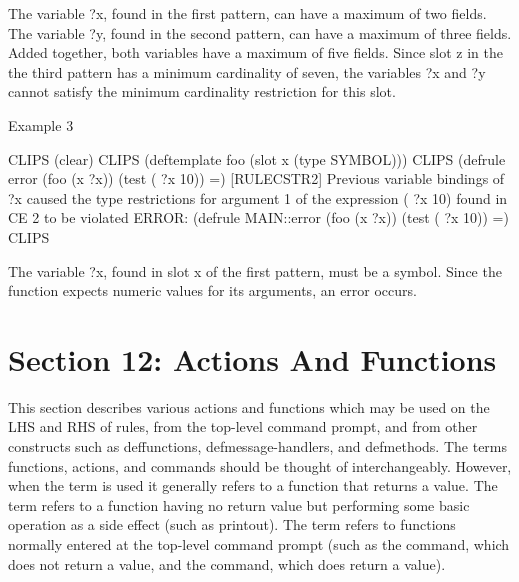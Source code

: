 \documentclass[letterpaper,10pt,english]{sphinxmanual}
\begin{document}
The variable ?x, found in the first pattern, can have a maximum of two
fields. The variable ?y, found in the second pattern, can have a maximum
of three fields. Added together, both variables have a maximum of five
fields. Since slot z in the the third pattern has a minimum cardinality
of seven, the variables ?x and ?y cannot satisfy the minimum cardinality
restriction for this slot.

Example 3

\begin{sphinxVerbatim}[commandchars=\\\{\}]
CLIPS\PYGZgt{} (clear)
CLIPS\PYGZgt{} (deftemplate foo (slot x (type SYMBOL)))
CLIPS\PYGZgt{}
(defrule error
(foo (x ?x))
(test (\PYGZgt{} ?x 10))
=\PYGZgt{})
[RULECSTR2] Previous variable bindings of ?x caused the type
restrictions for argument \PYGZsh{}1 of the expression (\PYGZgt{} ?x 10)
found in CE \PYGZsh{}2 to be violated
ERROR:
(defrule MAIN::error
(foo (x ?x))
(test (\PYGZgt{} ?x 10))
=\PYGZgt{})
CLIPS\PYGZgt{}
\end{sphinxVerbatim}

The variable ?x, found in slot x of the first pattern, must be a symbol.
Since the \sphinxstylestrong{\textgreater{}} function expects numeric values for its arguments, an
error occurs.

\label{\detokenize{constraints:section-9}}

\chapter{Section 12: Actions And Functions}
\label{\detokenize{actions:section-12-actions-and-functions}}\label{\detokenize{actions::doc}}
This section describes various actions and functions which may be used
on the LHS and RHS of rules, from the top-level command prompt, and from
other constructs such as deffunctions, defmessage-handlers, and
defmethods. The terms functions, actions, and commands should be thought
of interchangeably. However, when the term  is used it
generally refers to a function that returns a value. The term 
refers to a function having no return value but performing some basic
operation as a side effect (such as printout). The term 
refers to functions normally entered at the top-level command prompt
(such as the  command, which does not return a value, and the
 command, which does return a value).
\end{document}
